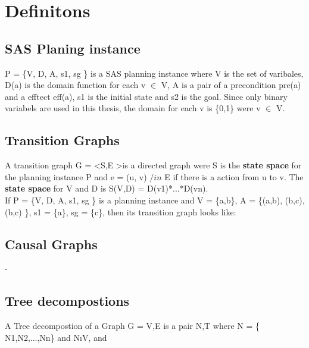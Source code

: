 \documentclass[cropmarks, frame, english]{idamasterthesis}
\begin{document}
\section{Definitons}
\subsection{SAS Planing instance}
P = \{V, D, A, s1, sg \} is a SAS planning instance where V is the set of varibales, D(a) is the domain function for each v $\in$ V, A is a pair of a precondition pre(a) and a efftect eff(a), s1 is the initial state and s2 is the goal.
Since only binary variabels are used in this thesis, the domain for each v is \{0,1\} were v $\in$ V.

\subsection{Transition Graphs}
A transition graph G = \textless S,E \textgreater is a directed graph were S is the \textbf{state space} for the planning instance P and e = (u, v) $/in$ E if there is a action from u to v. The \textbf{state space} for V and D is S(V,D) = D(v1)*...*D(vn).
\\
If P = \{V, D, A, s1, sg \} is a planning instance and  V = \{a,b\}, A = \{(a,b), (b,c), (b,c) \}, s1 = \{a\}, sg = \{c\}, then its transition graph looks like:


\subsection{Causal Graphs}
-
\subsection{Tree decompostions}
A Tree decompostion of a Graph G = \lessthen V,E \biggerthen is a pair \lessthen N,T \biggerthen where N = \{ N1,N2,...,Nn\} and N\i \subset V, and
\end{document}
